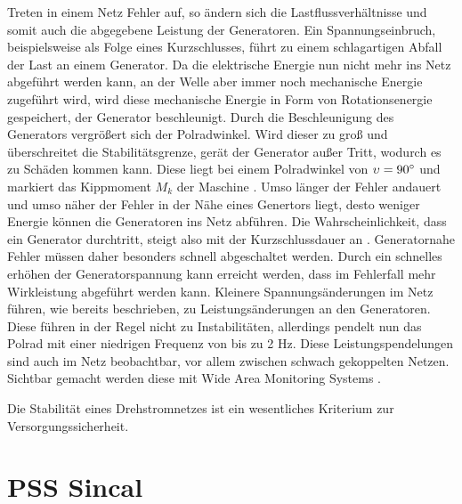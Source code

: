 \documentclass{scrartcl}
\begin{document}
\begin{onehalfspace}
Treten in einem Netz Fehler auf, so ändern sich die Lastflussverhältnisse und somit auch die abgegebene Leistung der Generatoren. Ein Spannungseinbruch, beispielsweise als Folge eines Kurzschlusses, führt zu einem schlagartigen Abfall der Last an einem Generator. Da die elektrische Energie nun nicht mehr ins Netz abgeführt werden kann, an der Welle aber immer noch mechanische Energie zugeführt wird, wird diese mechanische Energie in Form von Rotationsenergie gespeichert, der Generator beschleunigt. Durch die Beschleunigung des Generators vergrößert sich der Polradwinkel. Wird dieser zu groß und überschreitet die Stabilitätsgrenze, gerät der Generator \glqq außer Tritt\grqq, wodurch es zu Schäden kommen kann. Diese liegt bei einem Polradwinkel von $\upsilon = 90\degree$ und markiert das Kippmoment $M_k$ der Maschine \cite[S.187]{Heuck2007}. Umso länger der Fehler andauert und umso näher der Fehler in der Nähe eines Genertors liegt, desto weniger Energie können die Generatoren ins Netz abführen. Die Wahrscheinlichkeit, dass ein Generator \glqq durchtritt\grqq, steigt also mit der Kurzschlussdauer an \cite[S. 56]{Nelles2009}. Generatornahe Fehler müssen daher besonders schnell abgeschaltet werden. Durch ein schnelles erhöhen der Generatorspannung kann erreicht werden, dass im Fehlerfall mehr Wirkleistung abgeführt werden kann. Kleinere Spannungsänderungen im Netz führen, wie bereits beschrieben, zu Leistungsänderungen an den Generatoren. Diese führen in der Regel nicht zu Instabilitäten, allerdings pendelt nun das Polrad mit einer niedrigen Frequenz von bis zu 2 Hz. Diese Leistungspendelungen sind auch im Netz beobachtbar, vor allem zwischen schwach gekoppelten Netzen. Sichtbar gemacht werden diese mit Wide Area Monitoring Systems \cite{wams-swissgrid}.

Die Stabilität eines Drehstromnetzes ist ein wesentliches Kriterium zur Versorgungssicherheit.



\section{PSS Sincal}


\end{onehalfspace}
\end{document}
